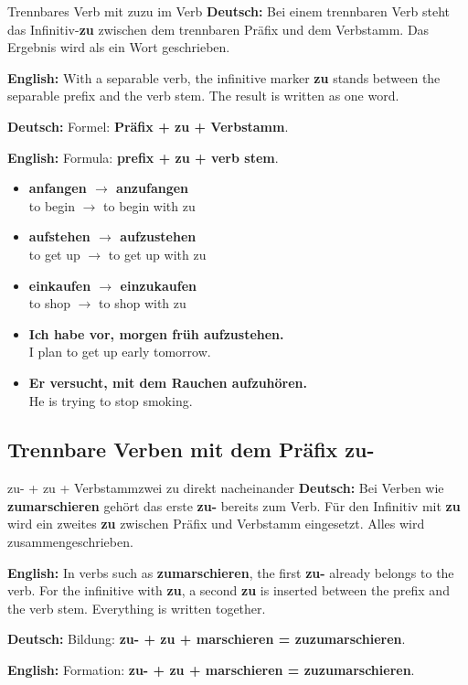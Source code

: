 \documentclass[a4paper,11pt]{article}
\newcommand{\GermanText}[1]{\textbf{Deutsch: }#1\par}
\newcommand{\EnglishText}[1]{{\small\color{SoftGray}\textbf{English: }#1\par}}
\newcommand{\ExampleItem}[2]{\item \textbf{#1}\\{\small\color{SoftGray}#2}}
\begin{document}
        \begin{grammarentry}{Trennbares Verb mit zu}{zu im Verb}
            \GermanText{Bei einem trennbaren Verb steht das Infinitiv-\textbf{zu} zwischen dem trennbaren Präfix und dem Verbstamm. Das Ergebnis wird als ein Wort geschrieben.}
            \EnglishText{With a separable verb, the infinitive marker \textbf{zu} stands between the separable prefix and the verb stem. The result is written as one word.}

            \GermanText{Formel: \textbf{Präfix + zu + Verbstamm}.}
            \EnglishText{Formula: \textbf{prefix + zu + verb stem}.}
        \end{grammarentry}

        \begin{exbox}
            \begin{itemize}
                \ExampleItem{anfangen $\rightarrow$ anzufangen}{to begin $\rightarrow$ to begin with zu}
                \ExampleItem{aufstehen $\rightarrow$ aufzustehen}{to get up $\rightarrow$ to get up with zu}
                \ExampleItem{einkaufen $\rightarrow$ einzukaufen}{to shop $\rightarrow$ to shop with zu}
                \ExampleItem{Ich habe vor, morgen früh aufzustehen.}{I plan to get up early tomorrow.}
                \ExampleItem{Er versucht, mit dem Rauchen aufzuhören.}{He is trying to stop smoking.}
            \end{itemize}
        \end{exbox}

        \subsection{Trennbare Verben mit dem Präfix \glqq zu-\grqq}

            \begin{grammarentry}{zu- + zu + Verbstamm}{zwei zu direkt nacheinander}
                \GermanText{Bei Verben wie \textbf{zumarschieren} gehört das erste \textbf{zu-} bereits zum Verb. Für den Infinitiv mit \textbf{zu} wird ein zweites \textbf{zu} zwischen Präfix und Verbstamm eingesetzt. Alles wird zusammengeschrieben.}
                \EnglishText{In verbs such as \textbf{zumarschieren}, the first \textbf{zu-} already belongs to the verb. For the infinitive with \textbf{zu}, a second \textbf{zu} is inserted between the prefix and the verb stem. Everything is written together.}

                \GermanText{Bildung: \textbf{zu- + zu + marschieren = zuzumarschieren}.}
                \EnglishText{Formation: \textbf{zu- + zu + marschieren = zuzumarschieren}.}
            \end{grammarentry}
\end{document}
